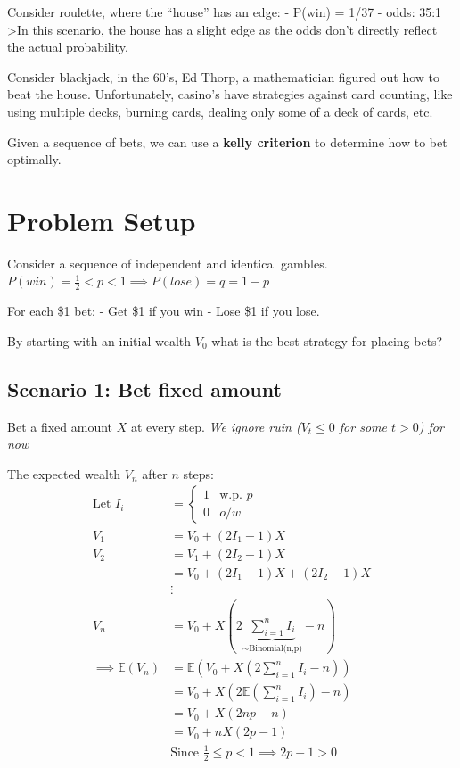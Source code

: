 \documentclass[
  oneside]{book}
\begin{document}
Consider roulette, where the ``house'' has an edge:
- P(win) = 1/37
- odds: 35:1
\textgreater In this scenario, the house has a slight edge as the odds don't directly reflect the actual probability.

Consider blackjack, in the 60's, Ed Thorp, a mathematician figured out how to beat the house. Unfortunately, casino's have strategies against card counting, like using multiple decks, burning cards, dealing only some of a deck of cards, etc.

Given a sequence of bets, we can use a \textbf{kelly criterion} to determine how to bet optimally.

\hypertarget{problem-setup}{%
\section{Problem Setup}\label{problem-setup}}

Consider a sequence of independent and identical gambles.
\(P(win) = \frac{1}{2}<p<1 \implies P(lose) = q = 1-p\)

For each \$1 bet:
- Get \$1 if you win
- Lose \$1 if you lose.

By starting with an initial wealth \(V_{0}\) what is the best strategy for placing bets?

\hypertarget{scenario-1-bet-fixed-amount}{%
\subsection{Scenario 1: Bet fixed amount}\label{scenario-1-bet-fixed-amount}}

Bet a fixed amount \(X\) at every step.
\emph{We ignore ruin (\(V_{t}\leq 0\) for some \(t>0\)) for now}

The expected wealth \(V_{n}\) after \(n\) steps:
\[
\begin{aligned}
\text{Let } I_{i} &= \begin{cases}
1  & \text{w.p. } p \\
0  & o/w
\end{cases}\\
V_{1} &= V_{0}+(2I_{1}-1)X\\
V_{2} &= V_{1}+(2I_{2}-1)X\\
&= V_{0}+(2I_{1}-1)X+(2I_{2}-1)X\\
&\vdots\\
V_{n} &= V_{0} + X\left( 2\underbrace{ \sum^{n}_{i=1}I_{i} }_{ \sim \text{Binomial(n,p)} }-n \right)\\
\implies \mathbb{E}(V_{n}) &= \mathbb{E}\left( V_{0}+X\left( 2\sum^{n}_{i=1}I_{i}-n \right) \right)\\
&= V_{0}+X\left( 2\mathbb{E}\left( \sum^{n}_{i=1}I_{i} \right)  -n\right)\\
&= V_{0}+X(2np-n)\\
&= V_{0}+nX(2p-1)\\
&\text{Since } \frac{1}{2}\leq p<1 \implies 2p-1 >0
\end{aligned}
\]
\end{document}
